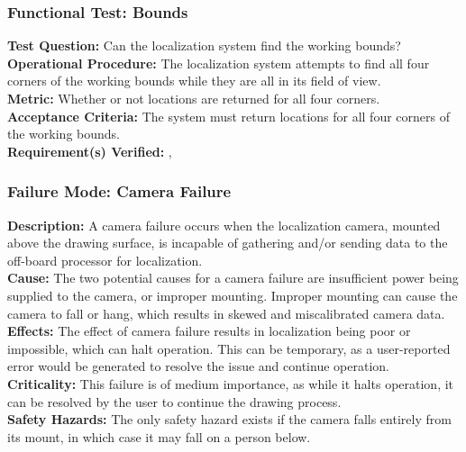 \subsubsection{Functional Test: Bounds}
\label{test:localization_ft_bounds}
\textbf{Test Question:} Can the localization system find the working bounds?\\
\textbf{Operational Procedure:} The localization system attempts to find all four corners of the working bounds while they are all in its field of view.\\
\textbf{Metric:} Whether or not locations are returned for all four corners.\\
\textbf{Acceptance Criteria:} The system must return locations for all four corners of the working bounds.\\
\textbf{Requirement(s) Verified:} , 

\subsubsection{Failure Mode: Camera Failure}
\label{sec:localization_fm_cam}
\textbf{Description:} A camera failure occurs when the localization camera, mounted above the drawing surface, is incapable of gathering and/or sending data to the off-board processor for localization.\\
\textbf{Cause:} The two potential causes for a camera failure are insufficient power being supplied to the camera, or improper mounting. Improper mounting can cause the camera to fall or hang, which results in skewed and miscalibrated camera data.\\
\textbf{Effects:}  The effect of camera failure results in localization being poor or impossible, which can halt operation. This can be temporary, as a user-reported error would be generated to resolve the issue and continue operation.\\
\textbf{Criticality:}  This failure is of medium importance, as while it halts operation, it can be resolved by the user to continue the drawing process.\\
\textbf{Safety Hazards:} The only safety hazard exists if the camera falls entirely from its mount, in which case it may fall on a person below. \\

